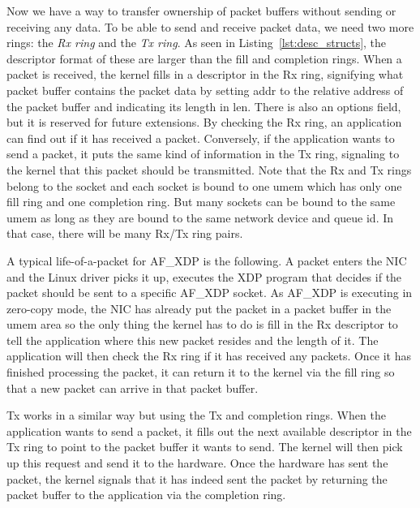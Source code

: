 \documentclass[9pt,numbers,reprint]{sigplanconf}
\begin{document}
Now we have a way to transfer ownership of packet buffers without
sending or receiving any data. To be able to send and receive packet data, we
need two more rings: the \emph{Rx ring} and the \emph{Tx ring}. As
seen in Listing~\ref{lst:desc_structs}, the descriptor format of these
are larger than the fill and completion rings. When a packet is
received, the kernel fills in a descriptor in the Rx ring, signifying
what packet buffer contains the packet data by setting addr to the
relative address of the packet buffer and indicating its
length in len. There is also an options field, but it is reserved for
future extensions. By checking the Rx ring, an application can find
out if it has received a packet. Conversely, if the application wants
to send a packet, it puts the same kind of information in the Tx
ring, signaling to the kernel that this packet should be
transmitted. Note that the Rx and Tx rings belong to the socket and
each socket is bound to one umem which has only one fill ring and one
completion ring. But many sockets can be bound to the same umem as
long as they are bound to the same network device and queue id. In
that case, there will be many Rx/Tx ring pairs.

A typical life-of-a-packet for AF\_XDP is the following. A packet
enters the NIC and the Linux driver picks it up, executes the XDP
program that decides if the packet should be sent to a specific AF\_XDP
socket. As AF\_XDP is executing in zero-copy mode, the NIC has already put
the packet in a packet buffer in the umem area so the only thing the
kernel has to do is fill in the Rx descriptor to tell the application
where this new packet resides and the length of it. The application
will then check the Rx ring if it has received any packets. Once it
has finished processing the packet, it can return it to the kernel via
the fill ring so that a new packet can arrive in that packet buffer.

Tx works in a similar way but using the Tx and completion rings. When
the application wants to send a packet, it fills out the next available
descriptor in the Tx ring to point to the packet buffer it wants to
send. The kernel will then pick up this request and send it to the
hardware. Once the hardware has sent the packet, the kernel signals
that it has indeed sent the packet by returning the packet buffer to
the application via the completion ring.
\end{document}
